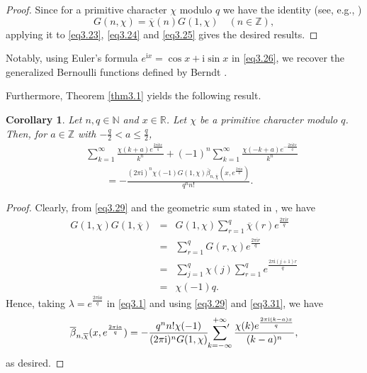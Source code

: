 \documentclass[reqno]{amsart}
\numberwithin{equation}{section}
\newtheorem{corollary}[thm]{Corollary}
\begin{document}
\begin{proof} Since for a primitive character $\chi$ modulo $q$ we have the identity (see, e.g., \cite[Theorem 8.15]{apostol4})
\begin{equation}\label{eq3.29}
G(n,\chi)=\overline{\chi}(n)G(1,\chi)\quad(n\in\mathbb{Z}),
\end{equation}
applying it to \eqref{eq3.23}, \eqref{eq3.24} and \eqref{eq3.25} gives the desired results.
\end{proof}

Notably, using Euler's formula $e^{\mathrm{i}x}=\cos x+\mathrm{i}\sin x$ in \eqref{eq3.26}, we recover the generalized Bernoulli functions defined by Berndt \cite[Definition 1]{berndt3}.

Furthermore, Theorem \ref{thm3.1} yields the following result.

\begin{corollary}\label{cor3.5} Let $n,q\in\mathbb{N}$ and $x\in\mathbb{R}$. Let $\chi$ be a primitive character modulo $q$. Then, for $a\in\mathbb{Z}$ with $-\frac{q}{2}< a\leqslant\frac{q}{2}$,
\begin{eqnarray}\label{eq3.30}
&&\sum_{k=1}^{\infty}\frac{\chi(k+a)e^{\frac{2\pi \mathrm{i}kx}{q}}}{k^{n}}+(-1)^{n}\sum_{k=1}^{\infty}\frac{\chi(-k+a)e^{-\frac{2\pi \mathrm{i}kx}{q}}}{k^{n}}\nonumber\\
&&\qquad=-\frac{(2\pi\mathrm{i})^{n}\chi(-1)G(1,\chi)\overline{\beta}_{n,\overline{\chi}}(x,e^{\frac{2\pi\mathrm{i}a}{q}})}{q^{n}n!}.
\end{eqnarray}
\end{corollary}

\begin{proof}
Clearly, from \eqref{eq3.29} and the geometric sum stated in \cite[Theorem 8.1]{apostol4}, we have
\begin{eqnarray}\label{eq3.31}
G(1,\chi)G(1,\overline{\chi})&=&G(1,\chi)\sum_{r=1}^{q}\overline{\chi}(r)e^{\frac{2\pi \mathrm{i}r}{q}}\nonumber\\
&=&\sum_{r=1}^{q}G(r,\chi)e^{\frac{2\pi \mathrm{i}r}{q}}\nonumber\\
&=&\sum_{j=1}^{q}\chi(j)\sum_{r=1}^{q}e^{\frac{2\pi \mathrm{i}(j+1)r}{q}}\nonumber\\
&=&\chi(-1)q.
\end{eqnarray}
Hence, taking $\lambda=e^{\frac{2\pi\mathrm{i}a}{q}}$ in \eqref{eq3.1} and using \eqref{eq3.29} and \eqref{eq3.31}, we have
\begin{equation*}
\overline{\beta}_{n,\overline{\chi}}(x,e^{\frac{2\pi\mathrm{i}a}{q}})=-\frac{q^{n}n!\chi(-1)}{(2\pi \mathrm{i})^{n}G(1,\chi)}\sideset{}{'}\sum_{k=-\infty}^{+\infty}\frac{\chi(k)e^{\frac{2\pi\mathrm{i}(k-a)x}{q}}}{(k-a)^{n}},
\end{equation*}
as desired.
\end{proof}
\end{document}

